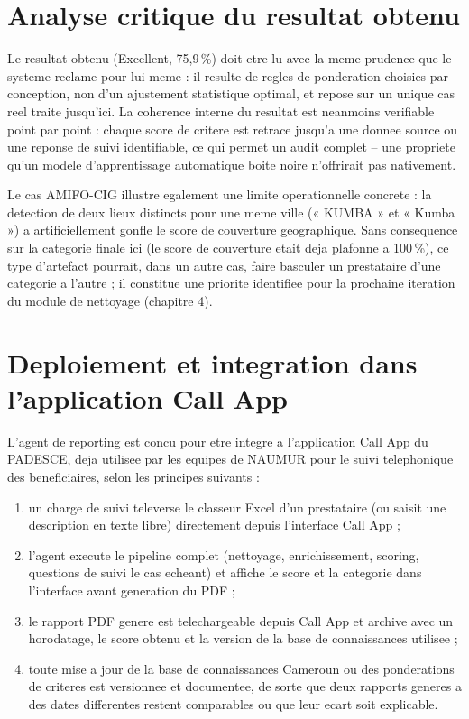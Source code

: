\documentclass[12pt,a4paper,twoside,openany]{report}
\begin{document}
\section{Analyse critique du resultat obtenu}

Le resultat obtenu (Excellent, 75,9\,\%) doit etre lu avec la meme prudence que le systeme reclame pour lui-meme : il resulte de regles de ponderation choisies par conception, non d'un ajustement statistique optimal, et repose sur un unique cas reel traite jusqu'ici. La coherence interne du resultat est neanmoins verifiable point par point : chaque score de critere est retrace jusqu'a une donnee source ou une reponse de suivi identifiable, ce qui permet un audit complet -- une propriete qu'un modele d'apprentissage automatique boite noire n'offrirait pas nativement.

Le cas AMIFO-CIG illustre egalement une limite operationnelle concrete : la detection de deux lieux distincts pour une meme ville (« KUMBA » et « Kumba ») a artificiellement gonfle le score de couverture geographique. Sans consequence sur la categorie finale ici (le score de couverture etait deja plafonne a 100\,\%), ce type d'artefact pourrait, dans un autre cas, faire basculer un prestataire d'une categorie a l'autre ; il constitue une priorite identifiee pour la prochaine iteration du module de nettoyage (chapitre 4).

\section{Deploiement et integration dans l'application Call App}

L'agent de reporting est concu pour etre integre a l'application Call App du PADESCE, deja utilisee par les equipes de NAUMUR pour le suivi telephonique des beneficiaires, selon les principes suivants :

\begin{enumerate}
\item un charge de suivi televerse le classeur Excel d'un prestataire (ou saisit une description en texte libre) directement depuis l'interface Call App ;
\item l'agent execute le pipeline complet (nettoyage, enrichissement, scoring, questions de suivi le cas echeant) et affiche le score et la categorie dans l'interface avant generation du PDF ;
\item le rapport PDF genere est telechargeable depuis Call App et archive avec un horodatage, le score obtenu et la version de la base de connaissances utilisee ;
\item toute mise a jour de la base de connaissances Cameroun ou des ponderations de criteres est versionnee et documentee, de sorte que deux rapports generes a des dates differentes restent comparables ou que leur ecart soit explicable.
\end{enumerate}
\end{document}
